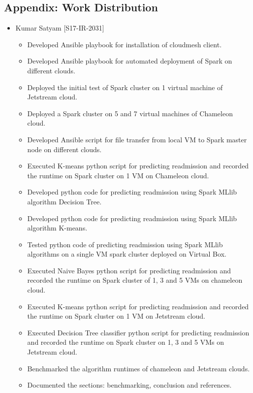 \documentclass[9pt,twocolumn,twoside]{../../styles/osajnl}
\begin{document}


\begin{appendices}
\appendix
\section{Appendix: Work Distribution}
\label{appendix:wd}
\begin{itemize}
    \item Kumar Satyam [S17-IR-2031]
    \begin{itemize}
        \item Developed Ansible playbook for installation of cloudmesh client.
        \item Developed Ansible playbook for automated deployment of Spark on different clouds.
        \item Deployed the initial test of Spark cluster on 1 virtual machine of Jetstream cloud.
        \item Deployed a Spark cluster  on 5 and 7 virtual machines of Chameleon cloud.
        \item Developed Ansible script for file transfer from local VM to Spark master node on different clouds.
        \item Executed K-means python script for predicting readmission and recorded the runtime on Spark cluster on 1 VM on Chameleon cloud.
        \item Developed python code for predicting readmission using Spark MLlib algorithm  Decision Tree.
        \item Developed python code for predicting readmission using Spark MLlib algorithm K-means.
        \item Tested python code of predicting readmission using Spark MLlib algorithms on a single VM spark cluster deployed on Virtual Box.
        \item Executed Naive Bayes python script for predicting readmission and recorded the runtime on Spark cluster of 1, 3 and 5 VMs on chameleon cloud.
        \item Executed K-means python script for predicting readmission and recorded the runtime on Spark cluster on 1 VM on Jetstream cloud.
        \item Executed Decision Tree classifier python script for predicting readmission and recorded the runtime on Spark cluster on 1, 3 and 5 VMs on Jetstream cloud.
        \item Benchmarked the algorithm runtimes of chameleon and Jetstream clouds.
        \item Documented the sections: benchmarking, conclusion and references.

\end{itemize}
\end{itemize}
\end{appendices}
\end{document}
